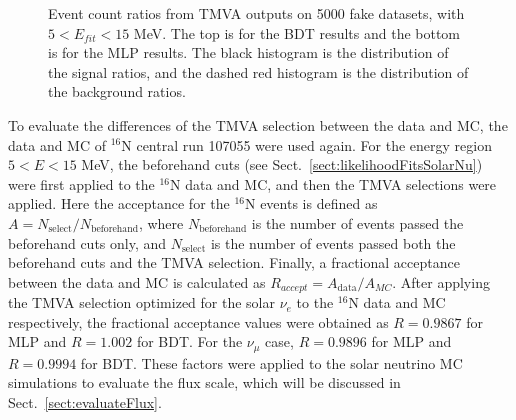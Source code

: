 \begin{figure}[htbp]
	\centering
	\caption[Event count ratios from TMVA outputs on 5000 fake datasets.]{Event count ratios from TMVA outputs on 5000 fake datasets, with $5<E_{fit}<15$ MeV. The top is for the BDT results and the bottom is for the MLP results. The black histogram is the distribution of the signal ratios, and the dashed red histogram is the distribution of the background ratios.\label{fig:TMVAfractions}}
\end{figure}

To evaluate the differences of the TMVA selection between the data and MC, the data and MC of $^{16}$N central run 107055 were used again. For the energy region $5<E<15$ MeV, the beforehand cuts (see Sect.~\ref{sect:likelihoodFitsSolarNu}) were first applied to the $^{16}$N data and MC, and then the TMVA selections were applied. Here the acceptance for the $^{16}$N events is defined as $A=N_\mathrm{select}/N_\mathrm{beforehand}$, where $N_\mathrm{beforehand}$ is the number of events passed the beforehand cuts only, and $N_\mathrm{select}$ is the number of events passed both the beforehand cuts and the TMVA selection. Finally, a fractional acceptance between the data and MC is calculated as $R_{accept}=A_\mathrm{data}/A_{MC}$. After applying the TMVA selection optimized for the solar $\nu_e$ to the $^{16}$N data and MC respectively, the fractional acceptance values were obtained as $R=0.9867$ for MLP and $R=1.002$ for BDT. For the $\nu_\mu$ case, $R=0.9896$ for MLP and $R=0.9994$ for BDT. These factors were applied to the solar neutrino MC simulations to evaluate the flux scale, which will be discussed in Sect.~\ref{sect:evaluateFlux}.

